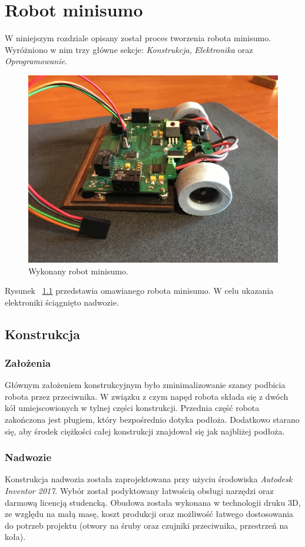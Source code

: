 \chapter{Robot minisumo}

W niniejszym rozdziale opisany został proces tworzenia robota minisumo. Wyróżniono w nim trzy główne sekcje: \textit{Konstrukcja}, \textit{Elektronika} oraz \textit{Oprogramowanie}.

\begin{figure}[H]
	\centering
		\includegraphics[width=0.75\linewidth]{pic04/minisumo.JPG}
	\caption{Wykonany robot minisumo.}
	\label{fig:robot}	
\end{figure}

Rysunek ~\ref{fig:robot} przedstawia omawianego robota minisumo. W celu ukazania elektroniki ściągnięto nadwozie.

\newpage 

\section{Konstrukcja}
\subsection{Założenia}
Głównym założeniem konstrukcyjnym było zminimalizowanie szansy podbicia robota przez przeciwnika. W związku z czym napęd robota składa się z dwóch kół umiejscowionych w tylnej części konstrukcji. Przednia część robota zakończona jest pługiem, który bezpośrednio dotyka podłoża. Dodatkowo starano się, aby środek ciężkości całej konstrukcji znajdował się jak najbliżej podłoża.

\subsection{Nadwozie}
Konstrukcja nadwozia została zaprojektowana przy użyciu środowiska \textit{Autodesk Inventor 2017}. Wybór został podyktowany łatwością obsługi narzędzi oraz darmową licencją studencką. Obudowa została wykonana w technologii druku 3D, ze względu na małą masę, koszt produkcji oraz możliwość łatwego dostosowania do potrzeb projektu (otwory na śruby oraz czujniki przeciwnika, przestrzeń na koła).  

